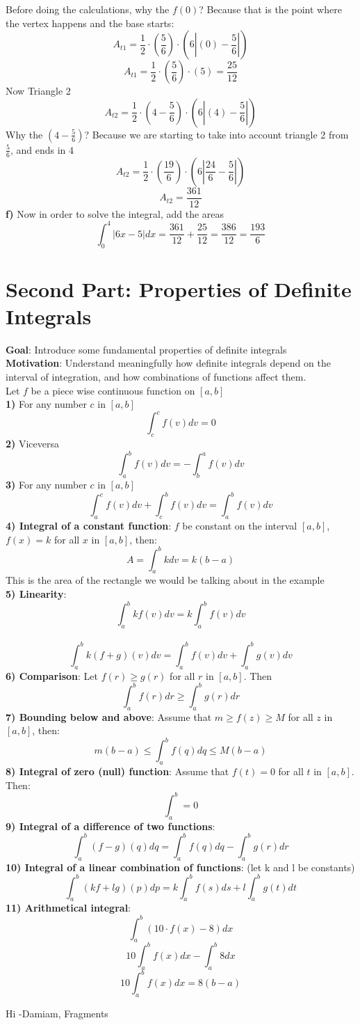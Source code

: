 \documentclass[12pt, letterpaper]{article}
\newcommand{\iii}{\ensuremath{\int_{a}^{b} f(q)dq}}
\newcommand{\ii}{\ensuremath{\int_{a}^{b}}}
\begin{document}
Before doing the calculations, why the \(f(0)\)? Because that is the point where the vertex happens and the base starts:
\[A_{t1} = \frac{1}{2}\cdot \left( \frac{5}{6} \right) \cdot \left( 6|(0)-\frac{5}{6}| \right)\]
\[A_{t1} = \frac{1}{2}\cdot \left( \frac{5}{6} \right) \cdot (5) = \frac{25}{12}\]
Now Triangle 2
\[A_{t2} = \frac{1}{2}\cdot \left( 4 - \frac{5}{6} \right) \cdot \left( 6|(4)-\frac{5}{6}| \right)\]
Why the \(\left( 4 - \frac{5}{6} \right)\)? Because we are starting to take into account triangle 2 from \(\frac{5}{6}\), and ends in \(4\)
\[A_{t2} = \frac{1}{2}\cdot \left( \frac{19}{6} \right) \cdot \left( 6|\frac{24}{6} - \frac{5}{6}| \right)\]
\[A_{t2} = \frac{361}{12}\]
\textbf{f)} Now in order to solve the integral, add the areas
\[\int_{0}^{4} |6x-5|dx = \frac{361}{12} + \frac{25}{12} = \frac{386}{12} = \frac{193}{6}\]
\section{Second Part: Properties of Definite Integrals}
\textbf{Goal}: Introduce some fundamental properties of definite integrals\\
\newline
\textbf{Motivation}: Understand meaningfully how definite integrals depend on the interval of integration, and how combinations of functions affect them.\\
\newline
Let \(f\) be a piece wise continuous function on \([a,b]\)\\
\newline
\textbf{1)} For any number \(c\) in \([a,b]\)
\[\int_{c}^{c}f(v)dv=0\]
\textbf{2)} Viceversa
\[\int_{a}^{b}f(v)dv=-\int_{b}^{a}f(v)dv\]
\textbf{3)} For any number \(c\) in \([a,b]\)
\[\int_{a}^{c}f(v)dv+\int_{c}^{b}f(v)dv = \int_{a}^{b}f(v)dv\]
\textbf{4) Integral of a constant function}: \(f\) be constant on the interval \([a,b]\), \(f(x)=k\) for all \(x\) in \([a,b]\), then:
\[A = \int_{a}^{b}kdv = k(b-a)\]
This is the area of the rectangle we would be talking about in the example\\
\newline
\textbf{5) Linearity}:
\[\int_{a}^{b}kf(v)dv= k \int_{a}^{b}f(v)dv\]\\
\[\int_{a}^{b}k(f+g)(v)dv= \int_{a}^{b}f(v)dv + \int_{a}^{b}g(v)dv\]
\textbf{6) Comparison}: Let \(f(r) \ge g(r)\) for all \(r\) in \([a,b]\). Then
\[\int_{a}^{b}f(r)dr \ge \int_{a}^{b}g(r)dr\]
\textbf{7) Bounding below and above}: Assume that \(m \ge f(z) \ge M\) for all \(z\) in \([a,b]\), then:
\[m(b-a) \le \iii \le M(b-a)\]
\textbf{8) Integral of zero (null) function}: Assume that \(f(t)=0\) for all \(t\) in \([a,b]\). Then:
\[\ii = 0\]
\textbf{9) Integral of a difference of two functions}:
\[\int_{a}^{b}(f-g)(q)dq = \iii - \int_{a}^{b}g(r)dr\]
\textbf{10) Integral of a linear combination of functions}: (let k and l be constants)
\[\int_{a}^{b} (kf+lg)(p)dp = k\ii f(s)ds + l\ii g(t)dt\]
\textbf{11) Arithmetical integral}:
\[\ii (10 \cdot f(x) - 8) dx\]
\[10  \ii f(x)dx - \ii 8dx\]
\[10  \ii f(x)dx = 8(b-a)\]

Hi
-Damiam, Fragments
\end{document}
